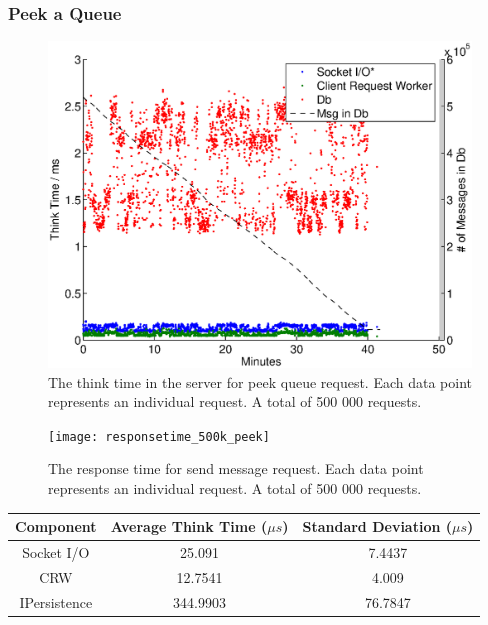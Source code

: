 \documentclass{article}
\begin{document}
            
        \subsubsection{Peek a Queue}
        
			\begin{figure}[H]
                \hspace{-1.5cm}
                \includegraphics[scale=0.50]{thinktime_500k_peek}
                \caption{The think time in the server for peek queue request. Each data point represents an individual request. A total of 500 000 requests.}
                \label{fig:thinktime_500k_peek}
            \end{figure}
            
			\begin{figure}[H]
                \hspace{-1.5cm}
                \texttt{[image: responsetime\_500k\_peek]}
                \caption{The response time for send message request. Each data point represents an individual request. A total of 500 000 requests.}
                \label{fig:responsetime_500k_peek}
            \end{figure}
            	
            	\begin{tabular}{|c|c|c|}
            	\hline 
            \textbf{Component} & \textbf{Average Think Time} ($\mu s$)  & \textbf{Standard Deviation ($\mu s$)} \\ 
            \hline 
            Socket I/O &25.091 &7.4437\\ 
            \hline 
		    CRW &12.7541 &4.009\\ 
            \hline 
			IPersistence &344.9903 &76.7847\\ 
            \hline 
            \end{tabular} 
            
\end{document}
